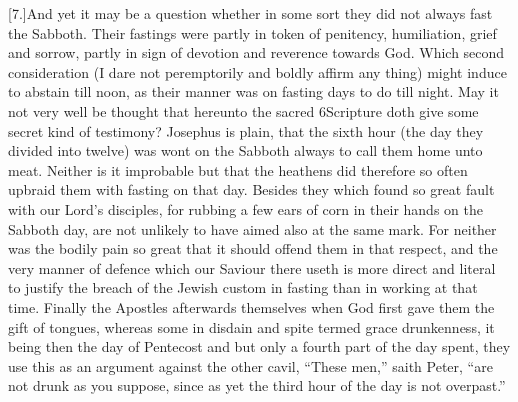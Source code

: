 [7.]And yet it may be a question whether in some sort they did not always fast the Sabboth. Their fastings were partly in token of penitency, humiliation, grief and sorrow, partly in sign of devotion and reverence towards God. Which second consideration (I dare not peremptorily and boldly affirm any thing) might induce to abstain till noon, as their manner was on fasting days to do till night. May it not very well be thought that hereunto the sacred 6Scripture doth give some secret kind of testimony? Josephus is plain,  that the sixth hour (the day they divided into twelve) was wont on the Sabboth always to call them home unto meat.
 Neither is it improbable but that the heathens did therefore so often upbraid them with fasting on that day. Besides they which found so great fault with our Lord’s disciples, for rubbing a few ears of corn in their hands on the Sabboth day, are not unlikely to have aimed also at the same mark. For neither was the bodily pain so great that it should offend them in that respect, and the very manner of defence which our Saviour there useth is more direct and literal to justify the breach of the Jewish custom in fasting than in working at that time. Finally the Apostles afterwards themselves when God first gave them the gift of tongues, whereas some in disdain and spite termed grace drunkenness, it being then the day of Pentecost and but only a fourth part of the day spent, they use this as an argument against the other cavil, “These men,” saith Peter, “are not drunk as you suppose, since as yet the third hour of the day is not overpast.”


